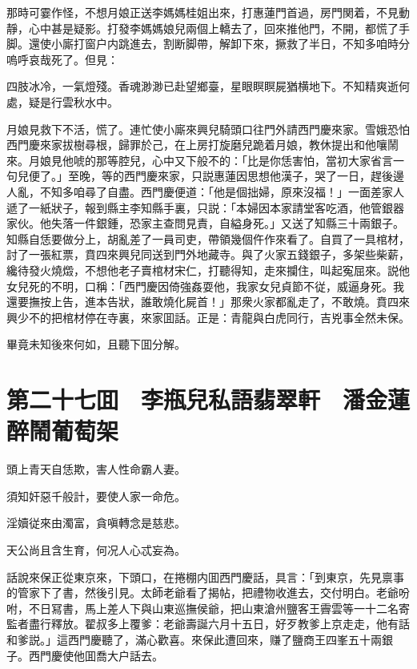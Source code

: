那時可霎作怪，不想月娘正送李媽媽桂姐出來，打惠蓮門首過，房門関着，不見動靜，心中甚是疑影。打發李媽媽娘兒兩個上轎去了，回來推他門，不開，都慌了手脚。還使小廝打窗户内跳進去，割断脚帶，解卸下來，撅救了半日，不知多咱時分嗚呼哀哉死了。但見：

四肢冰冷，一氣燈殘。香魂渺渺已赴望鄉臺，星眼瞑瞑屍猶横地下。不知精爽逝何處，疑是行雲秋水中。

月娘見救下不活，慌了。連忙使小廝來興兒騎頭口往門外請西門慶來家。雪娥恐怕西門慶來家拔樹尋根，歸罪於己，在上房打旋磨兒跪着月娘，教休提出和他嚷鬧來。月娘見他唬的那等腔兒，心中又下般不的：「比是你恁害怕，當初大家省言一句兒便了。」至晚，等的西門慶來家，只説惠蓮因思想他漢子，哭了一日，趕後邊人亂，不知多咱尋了自盡。西門慶便道：「他是個拙婦，原來沒福！」一面差家人遞了一紙狀子，報到縣主李知縣手裏，只説：「本婦因本家請堂客吃酒，他管銀器家伙。他失落一件銀鍾，恐家主查問見責，自縊身死。」又送了知縣三十兩銀子。知縣自恁要做分上，胡亂差了一員司吏，帶領幾個仵作來看了。自買了一具棺材，討了一張紅票，賁四來興兒同送到門外地藏寺。與了火家五錢銀子，多架些柴薪，纔待發火燒燬，不想他老子賣棺材宋仁，打聽得知，走來攔住，叫起寃屈來。説他女兒死的不明，口稱：「西門慶因倚強姦耍他，我家女兒貞節不従，威逼身死。我還要撫按上告，進本告狀，誰敢燒化屍首！」那衆火家都亂走了，不敢燒。賁四來興少不的把棺材停在寺裏，來家囬話。正是：青龍與白虎同行，吉兇事全然未保。

畢竟未知後來何如，且聽下囬分解。

\chapter*{第二十七囬　李瓶兒私語翡翠軒　潘金蓮醉鬧葡萄架}

頭上青天自恁欺，害人性命霸人妻。

須知奸惡千般計，要使人家一命危。

淫嬻従來由濁富，貪嗔轉念是慈悲。

天公尚且含生育，何况人心忒妄為。

話說來保正從東京來，下頭口，在捲棚内囬西門慶話，具言：「到東京，先見禀事的管家下了書，然後引見。太師老爺看了揭帖，把禮物收進去，交付明白。老爺吩咐，不日冩書，馬上差人下與山東巡撫侯爺，把山東滄州鹽客王霽雲等一十二名寄監者盡行釋放。翟叔多上覆爹：老爺壽誕六月十五日，好歹教爹上京走走，他有話和爹説。」這西門慶聽了，滿心歡喜。來保此遭回來，赚了鹽商王四峯五十兩銀子。西門慶使他囬喬大户話去。

